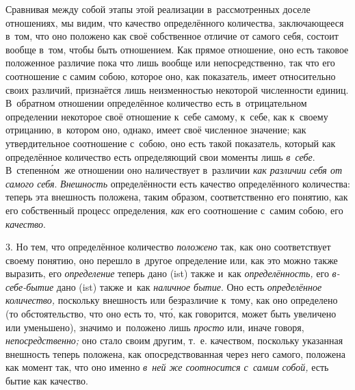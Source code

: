 Сравнивая между собой этапы этой реализации в~рассмотренных доселе отношениях,
мы видим, что качество определённого количества, заключающееся в~том, что оно
положено как своё собственное отличие от самого себя, состоит вообще в~том,
чтобы быть отношением. Как прямое отношение, оно есть таковое положенное
различие пока что лишь вообще или непосредственно, так что его соотношение с
самим собою, которое оно, как показатель, имеет относительно своих различий,
признаётся лишь неизменностью некоторой численности единиц. В~обратном
отношении определённое количество есть в~отрицательном определении некоторое
своё отношение к~себе самому, к~себе, как к~своему отрицанию, в~котором оно,
однако, имеет своё численное значение; как утвердительное соотношение с~собою,
оно есть такой показатель, который как определённое количество есть
определяющий свои моменты лишь {\em в~себе}. В~степенн\'{о}м~же отношении оно
наличествует в~различии {\em как различии себя от самого себя}. {\em Внешность}
определённости есть качество определённого количества: теперь эта внешность
положена, таким образом, соответственно его понятию, как его собственный
процесс определения, {\em как} его соотношение с~самим собою, его
{\em качество}.

3. Но тем, что определённое количество {\em положено} так, как оно
соответствует своему понятию, оно перешло в~другое определение или, как это
можно также выразить, его {\em определение} теперь дано (ist) также и~как
{\em определённость,} его {\em в-себе-бытие} дано (ist) также и~как
{\em наличное бытие}. Оно есть {\em определённое количество,} поскольку
внешность или безразличие к~тому, как оно определено (то обстоятельство, что
оно есть то, чт\'{о}, как говорится, может быть увеличено или уменьшено),
значимо и~положено лишь {\em просто} или, иначе говоря, {\em непосредственно;}
оно стало своим другим, т.~е. качеством, поскольку указанная внешность теперь
положена, как опосредствованная через него самого, положена как момент так, что
оно именно {\em в~ней же соотносится с~самим собой,} есть бытие как качество.

